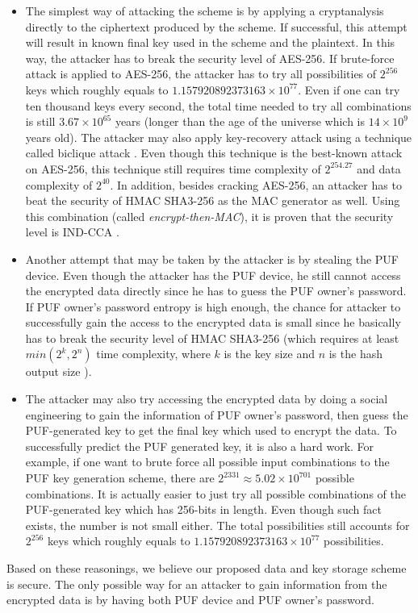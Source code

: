 \begin{itemize}
  \item The simplest way of attacking the scheme is by applying a cryptanalysis directly to the ciphertext produced by the scheme. If successful, this attempt will result in known final key used in the scheme and the plaintext.  In this way, the attacker has to break the security level of AES-256. If brute-force attack is applied to AES-256, the attacker has to try all possibilities of $2^{256}$ keys which roughly equals to $1.157920892373163 \times 10^{77}$. Even if one can try ten thousand keys every second, the total time needed to try all combinations is still $3.67 \times 10^{65}$ years (longer than the age of the universe which is $14 \times 10^9$ years old).
  The attacker may also apply key-recovery attack using a technique called biclique attack \cite{10.1007/978-3-319-19962-7_3}. Even though this technique is the best-known attack on AES-256, this technique still requires time complexity of $2^{254.27}$ and data complexity of $2^{40}$.
  In addition, besides cracking AES-256, an attacker has to beat the security of HMAC SHA3-256 as the MAC generator as well. Using this combination (called \textit{encrypt-then-MAC}), it is proven that the security level is IND-CCA \cite{Smart:2015:CMS:2927491}.
  \item Another attempt that may be taken by the attacker is by stealing the PUF device. Even though the attacker has the PUF device, he still cannot access the encrypted data directly since he has to guess the PUF owner's password. If PUF owner's password entropy is high enough, the chance for attacker to successfully gain the access to the encrypted data is small since he basically has to break the security level of HMAC SHA3-256 (which requires at least $min(2^k, 2^n)$ time complexity, where $k$ is the key size and $n$ is the hash output size \cite{hmac_security}).
  \item The attacker may also try accessing the encrypted data by doing a social engineering to gain the information of PUF owner's password, then guess the PUF-generated key to get the final key which used to encrypt the data. To successfully predict the PUF generated key, it is also a hard work. For example, if one want to brute force all possible input combinations to the PUF key generation scheme, there are $2^{2331} \approx 5.02 \times 10^{701}$ possible combinations. It is actually easier to just try all possible combinations of the PUF-generated key which has 256-bits in length. Even though such fact exists, the number is not small either. The total possibilities still accounts for $2^{256}$ keys which roughly equals to $1.157920892373163 \times 10^{77}$ possibilities.
\end{itemize}
Based on these reasonings, we believe our proposed data and key storage scheme is secure. The only possible way for an attacker to gain information from the encrypted data is by having both PUF device and PUF owner's password.

